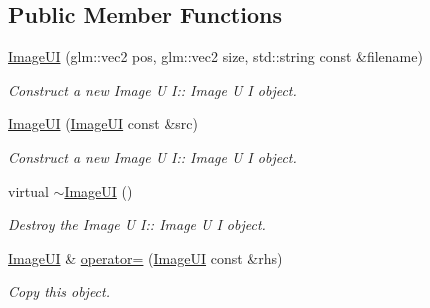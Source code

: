 \subsection*{Public Member Functions}
\begin{DoxyCompactItemize}
\item 
\hyperlink{class_image_u_i_a6bab778baf2de7b6fa49fbae8cdbcfdd}{Image\+UI} (glm\+::vec2 pos, glm\+::vec2 size, std\+::string const \&filename)
\begin{DoxyCompactList}\small\item\em Construct a new Image U I\+:\+: Image U I object. \end{DoxyCompactList}\item 
\hyperlink{class_image_u_i_a1eeb4f3d689afe519293d0f8a472c05c}{Image\+UI} (\hyperlink{class_image_u_i}{Image\+UI} const \&src)
\begin{DoxyCompactList}\small\item\em Construct a new Image U I\+:\+: Image U I object. \end{DoxyCompactList}\item 
\mbox{\label{class_image_u_i_aef1781e1c1134ce96d7760502f593239}} 
virtual \hyperlink{class_image_u_i_aef1781e1c1134ce96d7760502f593239}{$\sim$\+Image\+UI} ()
\begin{DoxyCompactList}\small\item\em Destroy the Image U I\+:\+: Image U I object. \end{DoxyCompactList}\item 
\hyperlink{class_image_u_i}{Image\+UI} \& \hyperlink{class_image_u_i_a4474a34185e782e1a4f6e2c6f8dfd2e2}{operator=} (\hyperlink{class_image_u_i}{Image\+UI} const \&rhs)
\begin{DoxyCompactList}\small\item\em Copy this object. \end{DoxyCompactList}\end{DoxyCompactItemize}
